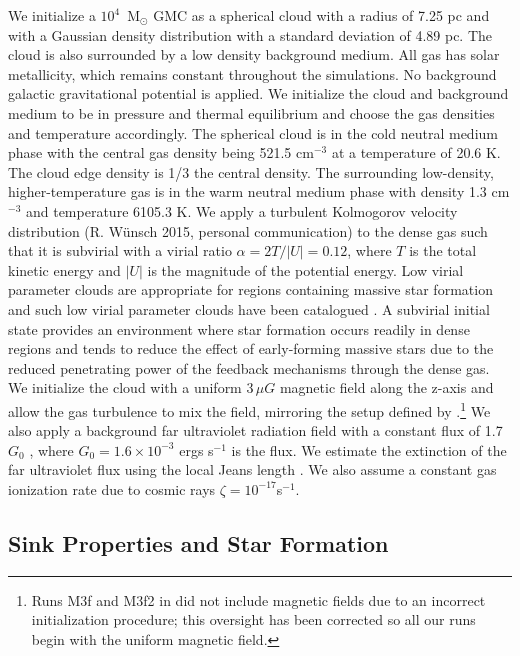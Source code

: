 \documentclass[twoside]{drexel-thesis}
\begin{document}
\begin{thesis}
We initialize a $10^4$~M$_{\odot}$ GMC as a spherical cloud with a radius of 7.25 pc and with a Gaussian density distribution \citep{bate_modelling_1995-1} with a standard deviation of 4.89 pc. The cloud is also surrounded by a low density background medium. All gas has solar metallicity, which remains constant throughout the simulations. No background galactic gravitational potential is applied.
We initialize the cloud and background medium to be in pressure and thermal equilibrium and choose the gas densities and temperature accordingly. The spherical cloud is in the cold neutral medium phase with the central gas density being 521.5 cm$^{-3}$ at a temperature of 20.6 K. The cloud edge density is 1/3 the central density. The surrounding low-density, higher-temperature gas is in the warm neutral medium phase with density 1.3 cm$^{-3}$ and temperature 6105.3 K.
We apply a turbulent Kolmogorov velocity distribution (R. W\"unsch 2015, personal communication) to the dense gas such that it is subvirial with a virial ratio $\alpha = 2T/|U| = 0.12$, where $T$ is the total kinetic energy and $|U|$ is the magnitude of the potential energy. Low virial parameter clouds are appropriate for regions containing massive star formation \citep{kauffmann_low_2013} and such low virial parameter clouds have been catalogued \citep{roman-duval_physical_2010, wienen_ammonia_2012}.
A subvirial initial state provides an environment where star formation occurs readily in dense regions and tends to reduce the effect of early-forming massive stars due to the reduced penetrating power of the feedback mechanisms through the dense gas.
We initialize the cloud with a uniform $3\,\mu G$ magnetic field along the z-axis and allow the gas turbulence to mix the field, mirroring the setup defined by \citet{wall_collisional_2019,wall_modeling_2020}.\footnote{Runs M3f and M3f2 in \citet{wall_modeling_2020} did not include magnetic fields due to an incorrect initialization procedure; this oversight has been corrected so all our runs begin with the uniform magnetic field.} 
We also apply a background far ultraviolet radiation field with a constant flux of 1.7$G_{0}$ \citep{draine_photoelectric_1978}, where $G_{0}=1.6\times10^{-3}$ ergs s$^{-1}$ is the \citet{habing_interstellar_1968} flux. We estimate the extinction of the far ultraviolet flux using the local Jeans length \citep{truelove_jeans_1997-1}. We also assume a constant gas ionization rate due to cosmic rays $\zeta=10^{-17}$s$^{-1}$.


\subsection{Sink Properties and Star Formation}


\end{thesis}
\end{document}
